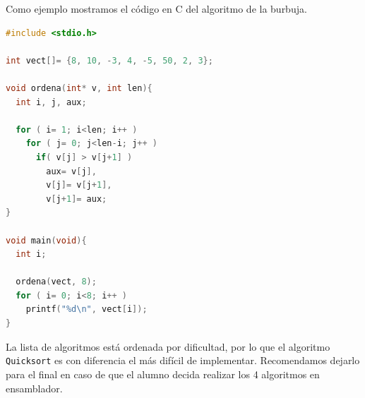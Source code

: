 Como ejemplo mostramos el código en C del algoritmo de la burbuja.

\begin{lstlisting}[caption={Parte de subrut9.c},label={lst:codigoPract3_10},language=C]
#include <stdio.h>

int vect[]= {8, 10, -3, 4, -5, 50, 2, 3};

void ordena(int* v, int len){
  int i, j, aux;

  for ( i= 1; i<len; i++ )
    for ( j= 0; j<len-i; j++ )
      if( v[j] > v[j+1] )
        aux= v[j],
        v[j]= v[j+1],
        v[j+1]= aux;
}

void main(void){
  int i;

  ordena(vect, 8);
  for ( i= 0; i<8; i++ )
    printf("%d\n", vect[i]);
}
\end{lstlisting}

La lista de algoritmos está ordenada por dificultad, por lo que el algoritmo
{\tt Quicksort} es con diferencia el más difícil de implementar. Recomendamos
dejarlo para el final en caso de que el alumno decida realizar los 4 algoritmos
en ensamblador.

\chapterend{}
